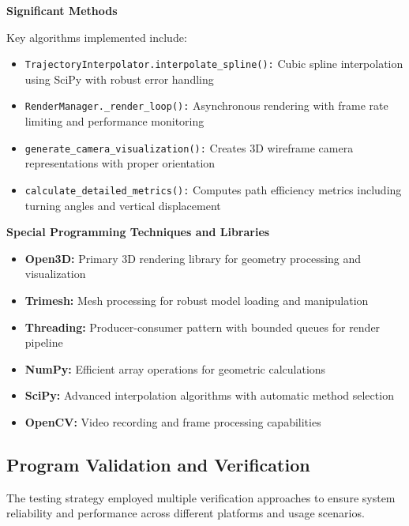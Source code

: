 \documentclass[11pt,a4paper]{article}
\begin{document}

\textbf{Significant Methods}

Key algorithms implemented include:

\begin{itemize}
\item \texttt{TrajectoryInterpolator.interpolate\_spline():} Cubic spline interpolation using SciPy with robust error handling
\item \texttt{RenderManager.\_render\_loop():} Asynchronous rendering with frame rate limiting and performance monitoring
\item \texttt{generate\_camera\_visualization():} Creates 3D wireframe camera representations with proper orientation
\item \texttt{calculate\_detailed\_metrics():} Computes path efficiency metrics including turning angles and vertical displacement
\end{itemize}

\textbf{Special Programming Techniques and Libraries}

\begin{itemize}
\item \textbf{Open3D:} Primary 3D rendering library for geometry processing and visualization
\item \textbf{Trimesh:} Mesh processing for robust model loading and manipulation
\item \textbf{Threading:} Producer-consumer pattern with bounded queues for render pipeline
\item \textbf{NumPy:} Efficient array operations for geometric calculations
\item \textbf{SciPy:} Advanced interpolation algorithms with automatic method selection
\item \textbf{OpenCV:} Video recording and frame processing capabilities
\end{itemize}

\subsection{Program Validation and Verification}
\label{ss:progr-valid-verif}

The testing strategy employed multiple verification approaches to ensure system reliability and performance across different platforms and usage scenarios.
\end{document}
